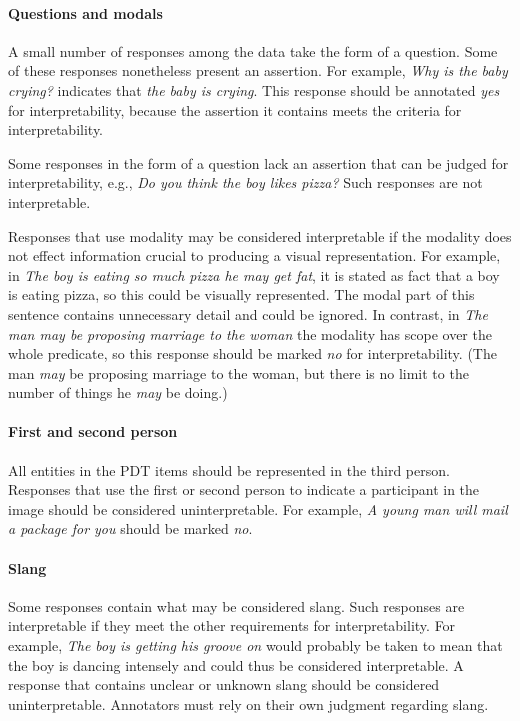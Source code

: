 \documentclass[12pt,notitlepage]{article}
\begin{document}
\paragraph{Questions and modals} \label{para:interp-question} A small number of responses among the data take the form of a question. Some of these responses nonetheless present an assertion. For example, \textit{Why is the baby crying?} indicates that \textit{the baby is crying}. This response should be annotated \textit{yes} for interpretability, because the assertion it contains meets the criteria for interpretability.

Some responses in the form of a question lack an assertion that can be judged for interpretability, e.g., \textit{Do you think the boy likes pizza?} Such responses are not interpretable.

Responses that use modality may be considered interpretable if the modality does not effect information crucial to producing a visual representation. For example, in \textit{The boy is eating so much pizza he may get fat}, it is stated as fact that a boy is eating pizza, so this could be visually represented. The modal part of this sentence contains unnecessary detail and could be ignored. In contrast, in \textit{The man may be proposing marriage to the woman} the modality has scope over the whole predicate, so this response should be marked \textit{no} for interpretability. (The man \textit{may} be proposing marriage to the woman, but there is no limit to the number of things he \textit{may} be doing.)

\paragraph{First and second person} All entities in the PDT items should be represented in the third person. Responses that use the first or second person to indicate a participant in the image should be considered uninterpretable. For example, \textit{A young man will mail a package for you} should be marked \textit{no}. 

\paragraph{Slang} Some responses contain what may be considered slang. Such responses are interpretable if they meet the other requirements for interpretability. For example, \textit{The boy is getting his groove on} would probably be taken to mean that the boy is dancing intensely and could thus be considered interpretable. A response that contains unclear or unknown slang should be considered uninterpretable. Annotators must rely on their own judgment regarding slang.
\end{document}
